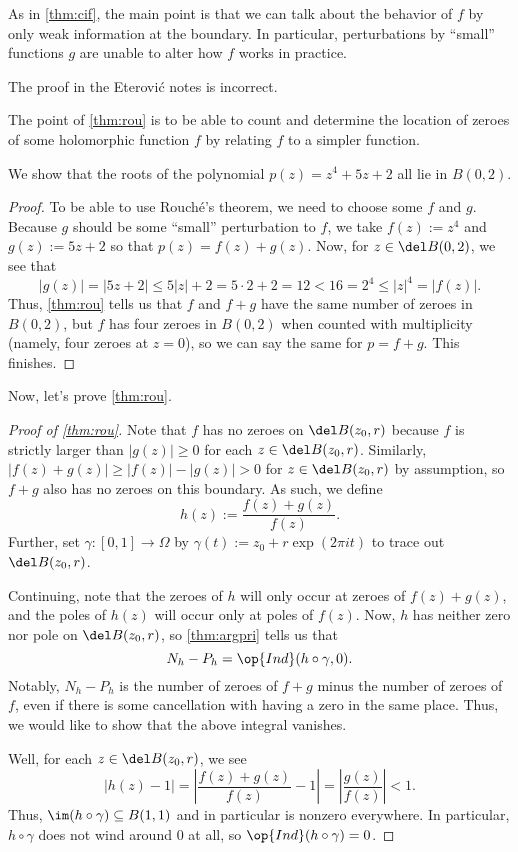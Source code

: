 \begin{remark}
	As in \autoref{thm:cif}, the main point is that we can talk about the behavior of $f$ by only weak information at the boundary. In particular, perturbations by ``small'' functions $g$ are unable to alter how $f$ works in practice.
\end{remark}
\begin{warn}
	The proof in the Eterovi\'c notes is incorrect.
\end{warn}
The point of \autoref{thm:rou} is to be able to count and determine the location of zeroes of some holomorphic function $f$ by relating $f$ to a simpler function.
\begin{exe}
	We show that the roots of the polynomial $p(z)=z^4+5z+2$ all lie in $B(0,2)$.
\end{exe}
\begin{proof}
	To be able to use Rouch\'e's theorem, we need to choose some $f$ and $g$. Because $g$ should be some ``small'' perturbation to $f$, we take $f(z):=z^4$ and $g(z):=5z+2$ so that $p(z)=f(z)+g(z)$. Now, for $z\in\del B(0,2)$, we see that
	\[|g(z)|=|5z+2|\le5|z|+2=5\cdot2+2=12<16=2^4\le|z|^4=|f(z)|.\]
	Thus, \autoref{thm:rou} tells us that $f$ and $f+g$ have the same number of zeroes in $B(0,2)$, but $f$ has four zeroes in $B(0,2)$ when counted with multiplicity (namely, four zeroes at $z=0$), so we can say the same for $p=f+g$. This finishes.
\end{proof}
Now, let's prove \autoref{thm:rou}.
\begin{proof}[Proof of \autoref{thm:rou}]
	Note that $f$ has no zeroes on $\del B(z_0,r)$ because $f$ is strictly larger than $|g(z)|\ge0$ for each $z\in\del B(z_0,r)$. Similarly, $|f(z)+g(z)|\ge|f(z)|-|g(z)|>0$ for $z\in \del B(z_0,r)$ by assumption, so $f+g$ also has no zeroes on this boundary. As such, we define
	\[h(z):=\frac{f(z)+g(z)}{f(z)}.\]
	Further, set $\gamma:[0,1]\to\Omega$ by $\gamma(t):=z_0+r\exp(2\pi it)$ to trace out $\del B(z_0,r)$.

	Continuing, note that the zeroes of $h$ will only occur at zeroes of $f(z)+g(z)$, and the poles of $h(z)$ will occur only at poles of $f(z)$. Now, $h$ has neither zero nor pole on $\del B(z_0,r)$, so \autoref{thm:argpri} tells us that
	\[N_h-P_h=\op{Ind}(h\circ\gamma,0).\]
	Notably, $N_h-P_h$ is the number of zeroes of $f+g$ minus the number of zeroes of $f$, even if there is some cancellation with having a zero in the same place. Thus, we would like to show that the above integral vanishes.

	Well, for each $z\in\del B(z_0,r)$, we see
	\[|h(z)-1|=\left|\frac{f(z)+g(z)}{f(z)}-1\right|=\left|\frac{g(z)}{f(z)}\right|<1.\]
	Thus, $\im(h\circ\gamma)\subseteq B(1,1)$ and in particular is nonzero everywhere. In particular, $h\circ\gamma$ does not wind around $0$ at all, so $\op{Ind}(h\circ\gamma)=0$.
\end{proof}
